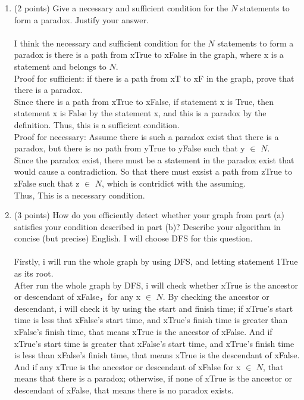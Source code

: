 \documentclass{assignment-263}
\begin{document}
\begin{enumerate}
\begin{enumerate}
	\item (2 points)
		Give a necessary and sufficient condition for the $N$
		statements to form a paradox. Justify your answer.\\\\
	I think the necessary and sufficient condition for the $N$ statements to form a paradox is there is a path from xTrue to xFalse in the graph, where x is a statement and belongs to $N$.\\
	Proof for sufficient: if there is a path from xT to xF in the graph, prove that there is a paradox.\\
	Since there is a path from xTrue to xFalse, if statement x is True, then statement x is False by the statement x, and this is a paradox by the definition. Thus, this is a sufficient condition.\\
	Proof for necessary: Assume there is such a paradox exist that there is a paradox, but there is no path from yTrue to yFalse such that y $\in$ $N$.\\
	Since the paradox exist, there must be a statement in the paradox exist that would cause a contradiction. So that there must exsist a path from zTrue to zFalse such that z $\in$ $N$, which is contridict with the assuming.\\
	Thus, This is a necessary condition.

	\item (3 points) How do you efficiently detect whether your graph from
        part (a) satisfies your condition described in
        part (b)? Describe your algorithm in concise (but
		precise) English.
	I will choose DFS for this question.\\\\
	Firstly, i will run the whole graph by using DFS, and letting statement 1True as its root.\\
	After run the whole graph by DFS, i will check whether xTrue is the ancestor or descendant of xFalse，for any x $\in$ $N$. By checking the ancestor or descendant, i will check it by using the start and finish time; if xTrue's start time is less that xFalse's start time, and xTrue's finish time is greater than xFalse's finish time, that means xTrue is the ancestor of xFalse. And if xTrue's start time is greater that xFalse's start time, and xTrue's finish time is less than xFalse's finish time, that means xTrue is the descendant of xFalse.\\
	And if any xTrue is the ancestor or descendant of xFalse for x $\in$ $N$, that means that there is a paradox; otherwise, if none of xTrue is the ancestor or descendant of xFalse, that means there is no paradox exists.
	

\end{enumerate}
\end{enumerate}
\end{document}

